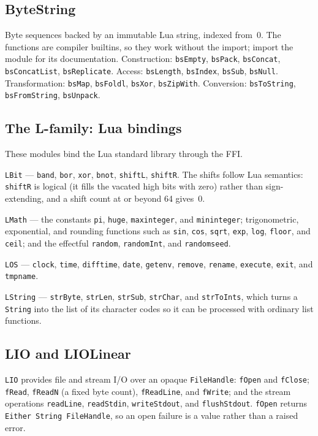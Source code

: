 \documentclass[11pt,a4paper]{article}
\begin{document}
\subsection{ByteString}

Byte sequences backed by an immutable Lua string, indexed from~0. The
functions are compiler builtins, so they work without the import;
import the module for its documentation. Construction:
\texttt{bsEmpty}, \texttt{bsPack}, \texttt{bsConcat},
\texttt{bsConcatList}, \texttt{bsReplicate}. Access: \texttt{bsLength},
\texttt{bsIndex}, \texttt{bsSub}, \texttt{bsNull}. Transformation:
\texttt{bsMap}, \texttt{bsFoldl}, \texttt{bsXor}, \texttt{bsZipWith}.
Conversion: \texttt{bsToString}, \texttt{bsFromString},
\texttt{bsUnpack}.

\subsection{The L-family: Lua bindings}

These modules bind the Lua standard library through the FFI.

\texttt{LBit} --- \texttt{band}, \texttt{bor}, \texttt{xor},
\texttt{bnot}, \texttt{shiftL}, \texttt{shiftR}. The shifts follow Lua
semantics: \texttt{shiftR} is logical (it fills the vacated high bits
with zero) rather than sign-extending, and a shift count at or beyond
64 gives~0.

\texttt{LMath} --- the constants \texttt{pi}, \texttt{huge},
\texttt{maxinteger}, and \texttt{mininteger}; trigonometric,
exponential, and rounding functions such as \texttt{sin}, \texttt{cos},
\texttt{sqrt}, \texttt{exp}, \texttt{log}, \texttt{floor}, and
\texttt{ceil}; and the effectful \texttt{random}, \texttt{randomInt},
and \texttt{randomseed}.

\texttt{LOS} --- \texttt{clock}, \texttt{time}, \texttt{difftime},
\texttt{date}, \texttt{getenv}, \texttt{remove}, \texttt{rename},
\texttt{execute}, \texttt{exit}, and \texttt{tmpname}.

\texttt{LString} --- \texttt{strByte}, \texttt{strLen},
\texttt{strSub}, \texttt{strChar}, and \texttt{strToInts}, which turns a
\texttt{String} into the list of its character codes so it can be
processed with ordinary list functions.

\subsection{LIO and LIOLinear}

\texttt{LIO} provides file and stream I/O over an opaque
\texttt{FileHandle}: \texttt{fOpen} and \texttt{fClose}; \texttt{fRead},
\texttt{fReadN} (a fixed byte count), \texttt{fReadLine}, and
\texttt{fWrite}; and the stream operations \texttt{readLine},
\texttt{readStdin}, \texttt{writeStdout}, and \texttt{flushStdout}.
\texttt{fOpen} returns \texttt{Either String FileHandle}, so an open
failure is a value rather than a raised error.
\end{document}
